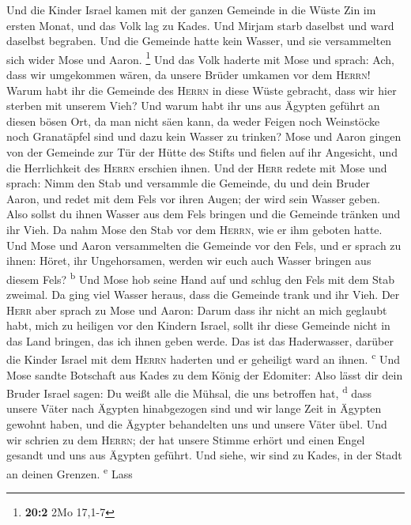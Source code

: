  Und die Kinder Israel kamen mit der ganzen Gemeinde in
die Wüste Zin im ersten Monat, und das Volk lag zu Kades. Und Mirjam
starb daselbst und ward daselbst begraben.  Und die
Gemeinde hatte kein Wasser, und sie versammelten sich wider Mose und
Aaron. \footnote{\textbf{20:2} 2Mo 17,1-7}  Und das Volk
haderte mit Mose und sprach: Ach, dass wir umgekommen wären, da unsere
Brüder umkamen vor dem \textsc{Herrn}!  Warum habt ihr die
Gemeinde des \textsc{Herrn} in diese Wüste gebracht, dass wir hier
sterben mit unserem Vieh?  Und warum habt ihr uns aus
Ägypten geführt an diesen bösen Ort, da man nicht säen kann, da weder
Feigen noch Weinstöcke noch Granatäpfel sind und dazu kein Wasser zu
trinken?  Mose und Aaron gingen von der Gemeinde zur Tür
der Hütte des Stifts und fielen auf ihr Angesicht, und die Herrlichkeit
des \textsc{Herrn} erschien ihnen.  Und der \textsc{Herr}
redete mit Mose und sprach:  Nimm den Stab und versammle
die Gemeinde, du und dein Bruder Aaron, und redet mit dem Fels vor ihren
Augen; der wird sein Wasser geben. Also sollst du ihnen Wasser aus dem
Fels bringen und die Gemeinde tränken und ihr Vieh.  Da
nahm Mose den Stab vor dem \textsc{Herrn}, wie er ihm geboten hatte.
 Und Mose und Aaron versammelten die Gemeinde vor den
Fels, und er sprach zu ihnen: Höret, ihr Ungehorsamen, werden wir euch
auch Wasser bringen aus diesem Fels? \textsuperscript{b} 
Und Mose hob seine Hand auf und schlug den Fels mit dem Stab zweimal. Da
ging viel Wasser heraus, dass die Gemeinde trank und ihr Vieh.
 Der \textsc{Herr} aber sprach zu Mose und Aaron: Darum
dass ihr nicht an mich geglaubt habt, mich zu heiligen vor den Kindern
Israel, sollt ihr diese Gemeinde nicht in das Land bringen, das ich
ihnen geben werde.  Das ist das Haderwasser, darüber die
Kinder Israel mit dem \textsc{Herrn} haderten und er geheiligt ward an
ihnen. \textsuperscript{c}  Und Mose sandte Botschaft aus
Kades zu dem König der Edomiter: Also lässt dir dein Bruder Israel
sagen: Du weißt alle die Mühsal, die uns betroffen hat,
\textsuperscript{d}  dass unsere Väter nach Ägypten
hinabgezogen sind und wir lange Zeit in Ägypten gewohnt haben, und die
Ägypter behandelten uns und unsere Väter übel.  Und wir
schrien zu dem \textsc{Herrn}; der hat unsere Stimme erhört und einen
Engel gesandt und uns aus Ägypten geführt. Und siehe, wir sind zu Kades,
in der Stadt an deinen Grenzen. \textsuperscript{e}  Lass
